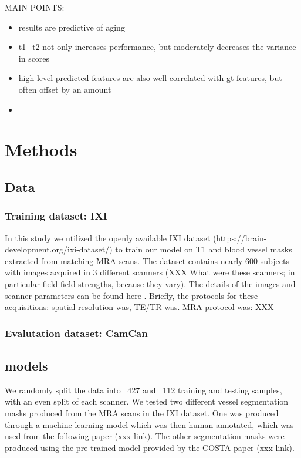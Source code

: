 \documentclass{article}
\begin{document}
MAIN POINTS:
\begin{itemize}
    \item results are predictive of aging
    \item t1+t2 not only increases performance, but moderately decreases the variance in scores
    \item high level predicted features are also well correlated with gt features, but often offset by an amount
    \item 
    
\end{itemize}

\section{Methods}

\subsection{Data}

\subsubsection{Training dataset: IXI}

In this study we utilized the openly available IXI dataset (https://brain-development.org/ixi-dataset/) to train our model on T1 and blood vessel masks extracted from matching MRA scans. The dataset contains nearly 600 subjects with images acquired in 3 different scanners (XXX What were these scanners; in particular field field strengths, because they vary). The details of the images and scanner parameters can be found here . Briefly, the protocols for these acquisitions: spatial resolution was, TE/TR was. MRA protocol was: XXX

\subsubsection{Evalutation dataset: CamCan}

\subsection{models}

We randomly split the data into ~427 and ~112 training and testing samples, with an even split of each scanner. We tested two different vessel segmentation masks produced from the MRA scans in the IXI dataset. One was produced through a machine learning model which was then human annotated, which was used from the following paper (xxx link). The other segmentation masks were produced using the pre-trained model provided by the COSTA paper (xxx link). 
\end{document}
